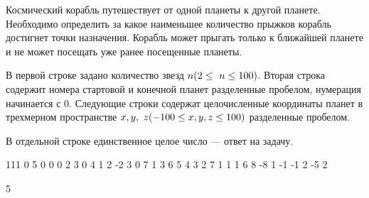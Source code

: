 
Космический корабль путешествует от одной планеты к другой планете. Необходимо определить за какое наименьшее количество прыжков корабль достигнет точки назначения. Корабль может прыгать только к ближайшей планете и не может посещать уже ранее посещенные планеты.


В первой строке задано количество звезд $n\space (2 \leq n \leq 100)$. Вторая строка содержит номера стартовой и конечной планет разделенные пробелом, нумерация начинается с $0$. Следующие строки содержат целочисленные координаты планет в трехмерном пространстве $x,\space y,\space z\space (-100\leq x, y, z\leq 100)$ разделенные пробелом. 

\outputfmtSection

В отдельной строке единственное целое число — ответ на задачу.


\begin{myverbbox}[\small]{\vinput}
    111
    0 5
    0 0 0
    2 3 0
    4 1 2
    -2 3 0
    7 1 3
    6 5 4
    3 2 7
    1 1 1
    6 8 -8
    1 -1 -1
    2 -5 2
\end{myverbbox}
\begin{myverbbox}[\small]{\voutput}
    5
\end{myverbbox}

